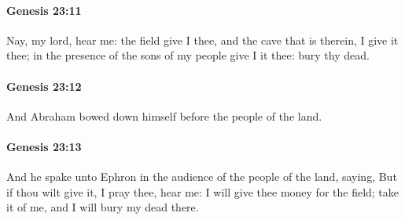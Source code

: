 		\paragraph{Genesis 23:11} %
			\label{GENESIS-23-11}

			Nay, my lord, hear me: the field give I thee, and the cave that is therein, I give it thee; in the presence of the sons of my people give I it thee: bury thy dead.


		\paragraph{Genesis 23:12} %
			\label{GENESIS-23-12}

			And Abraham bowed down himself before the people of the land.


		\paragraph{Genesis 23:13} %
			\label{GENESIS-23-13}

			And he spake unto Ephron in the audience of the people of the land, saying, But if thou wilt give it, I pray thee, hear me: I will give thee money for the field; take it of me, and I will bury my dead there.


